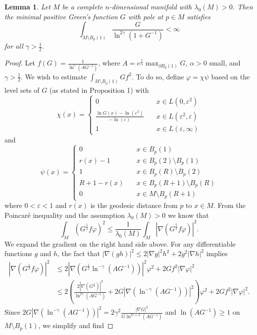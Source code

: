 \documentclass{amsart}
\newtheorem{lemma}[theorem]{Lemma}
\theoremstyle{definition}
\theoremstyle{remark}
\numberwithin{equation}{section}
\begin{document}
\begin{lemma}
    Let $M$ be a complete $n$-dimensional manifold with $\lambda_0(M)>0$. Then the minimal positive Green's function $G$ with pole at $p\in M$ satisfies
\begin{equation*}
\int_{M\setminus B_p(1)} \frac{G}{\ln^{2\gamma}(1+G^{-1})}<\infty
\end{equation*}
for all $\gamma > \frac{1}{2}$.
\end{lemma}

\begin{proof}
Let $f(G) = \frac{1}{\ln^{\gamma}(AG^{-1})}$, where $A=e^\frac{1}{\alpha}\max_{\partial B_p(1)} G$, $\alpha>0$ small, and $\gamma>\frac{1}{2}$. We wish to estimate $\int_{M\setminus B_p(1)} Gf^2$. To do so, define $\varphi = \chi \psi$ based on the level sets of $G$ (as stated in Proposition 1) with
\[
\chi(x) = 
\begin{cases} 
    0               &\quad x\in L(0,\varepsilon^2)\\
    \frac{\ln G(x) - \ln(\varepsilon^2)}{-\ln(\varepsilon)}         &\quad x\in L(\varepsilon^2,\varepsilon)\\
    1               &\quad x\in L(\varepsilon,\infty)
\end{cases}
\]
and 
\[
\psi(x) = 
\begin{cases}
    0                 & \quad x \in B_p(1) \\
    r(x) - 1          & \quad x \in B_p(2) \setminus B_p(1) \\
    1                 & \quad x \in B_p(R) \setminus B_p(2) \\
    R+1 - r(x)        & \quad x \in B_p(R+1) \setminus B_p(R) \\
    0                 & \quad x \in M \setminus B_p(R+1)
\end{cases}
\]
where $0<\varepsilon<1$ and $r(x)$ is the geodesic distance from $p$ to $x\in M$. From the Poincar\'e inequality and the assumption $\lambda_0(M)>0$ we know that 
\begin{equation*}
\int_M (G^\frac{1}{2}f\varphi)^2\leq \frac{1}{\lambda_0(M)}\int_M \left|\nabla (G^\frac{1}{2}f\varphi)\right|^2.
\end{equation*}
We expand the gradient on the right hand side above. For any differentiable functions $g$ and $h$, the fact that $|\nabla (gh)|^2\leq 2|\nabla g|^2h^2+2g^2|\nabla h|^2$ implies
\begin{align*}
\left|\nabla\left(G^\frac{1}{2}f \varphi\right)\right|^2 & \leq 2|\nabla(G^\frac{1}{2}\ln^{-\gamma}(AG^{-1}))|^2\varphi^2+2Gf^2|\nabla\varphi|^2\\
&\leq 2\left(\frac{2|\nabla (G^\frac{1}{2})|^2}{\ln^{2\gamma}(AG^{-1})}+2G|\nabla(\ln^{-\gamma}(AG^{-1}))|^2\right)\varphi^2+2Gf^2|\nabla\varphi|^2.
\end{align*}
Since $2G|\nabla(\ln^{-\gamma}(AG^{-1}))|^2 = 2\gamma^2\frac{|\nabla G|^2}{G\ln^{2\gamma+2}(AG^{-1})}$ and $\ln(AG^{-1})\geq 1$ on $M\setminus B_p(1)$, we simplify and find


\end{proof}
\end{document}
